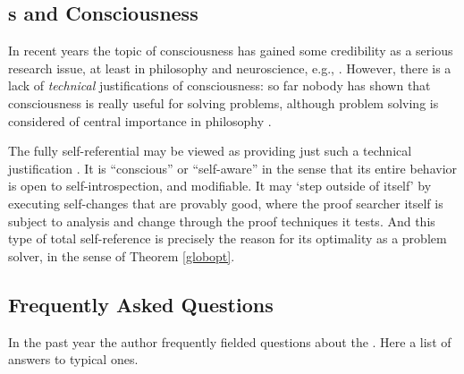 \subsection{\GMn s and Consciousness}
\label{conscious}

In recent years the topic of consciousness
has gained some credibility as a serious research issue,
at least in philosophy and neuroscience, e.g., \cite{Crick:98}.
However, there is a lack 
of {\em technical} justifications of consciousness:
so far nobody has shown that 
consciousness is really useful for solving problems,
although problem solving is considered 
of central importance in philosophy \cite{Popper:99}. 

The fully self-referential \gm may be viewed as providing 
just such a technical justification \cite{Schmidhuber:05gmconscious}.
It is ``conscious'' or ``self-aware'' in the sense that
its entire behavior is open to self-introspection,
and modifiable.  
It may `step outside of itself' \cite{Hofstadter:79} 
by  executing self-changes that are provably good,
where the proof searcher itself is subject
to analysis and change through the proof techniques it tests.
And this type of total self-reference is precisely 
the reason for its optimality as a problem solver, in the 
sense of Theorem \ref{globopt}.

\subsection{Frequently Asked Questions}
\label{faq}

In the past year the author frequently
fielded questions about the \gmn. 
Here a list of answers to typical ones.

